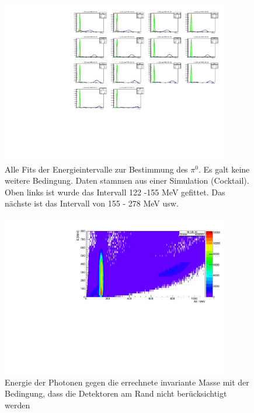\documentclass[a4paper,11pt,oneside,final,german,openbib,pdftex]{scrbook}
\begin{document}
\begin{appendix}
\begin{figure}
	\begin{center}
		\includegraphics[width=100mm]{NoEdgeAngleAllFits1403}
		\caption{Alle Fits der Energieintervalle zur Bestimmung des $\pi^0$. Es galt keine weitere Bedingung. Daten stammen aus einer Simulation (Cocktail). Oben links ist wurde das Intervall 122 -155 MeV gefittet. Das nächste ist das Intervall von 155 - 278 MeV usw.}
	\end{center}
\end{figure}


\begin{figure}[h!]
	\begin{center}
		\includegraphics[width=100mm]{30DegreeEdge1403}
		\caption{Energie der Photonen gegen die errechnete invariante Masse mit der Bedingung, dass die Detektoren am Rand nicht ber\"ucksichtigt werden}
		\label{fig:Energy-Intervall-2D-Hist-30-Edge-1403}
	\end{center}
\end{figure}


\end{appendix}
\end{document}
